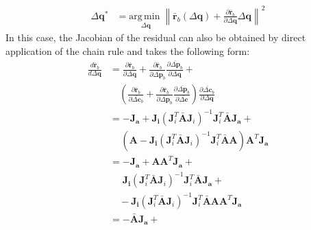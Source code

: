 \begin{equation}
    \begin{aligned}
        \Delta\mathbf{q}^* & = \underset{\Delta\mathbf{q}}{\mathrm{arg\,min\;}}  \left\| \bar{\mathbf{r}}_b(\Delta\mathbf{q}) + \frac{\partial \bar{\mathbf{r}}_b}{\partial\Delta\mathbf{q}} \Delta\mathbf{q} \right\|^2
    \label{eq:bidirectional_wiberg_problem2}
    \end{aligned}
\end{equation}
In this case, the Jacobian of the residual can also be obtained by direct application of the chain rule and takes the following form:
\begin{equation}
    \begin{aligned}
        \frac{d \bar{\mathbf{r}}_b}{d \Delta \mathbf{q}} & = \frac{\partial \bar{\mathbf{r}}_b}{\partial \Delta \mathbf{q}} + \frac{\partial \bar{\mathbf{r}}_b}{\partial \bar{\Delta \mathbf{p}}_b} \frac{\partial \bar{\Delta \mathbf{p}}_b}{\partial \Delta \mathbf{q}} +
        \\
        & \quad \left( \frac{\partial\bar{\mathbf{r}}_b}{\partial \bar{\Delta \mathbf{c}}_b} + \frac{\partial \bar{\mathbf{r}}_b}{\partial \bar{\Delta \mathbf{p}}_b} \frac{\partial \bar{\Delta \mathbf{p}}_b}{\partial \bar{\Delta \mathbf{c}}} \right) \frac{\partial \bar{\Delta \mathbf{c}}_b}{\partial \Delta \mathbf{q}}
        \\
        & = - \mathbf{J}_{\mathbf{a}} + \mathbf{J}_{\mathbf{i}} \left( \mathbf{J}_i^T \bar{\mathbf{A}} \mathbf{J}_i \right)^{-1} \mathbf{J}_i^T \bar{\mathbf{A}} \mathbf{J}_{\mathbf{a}} +
        \\
        & \quad \, \left(\mathbf{A} - \mathbf{J}_{\mathbf{i}} \left( \mathbf{J}_i^T \bar{\mathbf{A}} \mathbf{J}_i \right)^{-1} \mathbf{J}_i^T \bar{\mathbf{A}} \mathbf{A} \right) \mathbf{A}^T \mathbf{J}_{\mathbf{a}}
        \\
        & = - \mathbf{J}_{\mathbf{a}} + \mathbf{A}\mathbf{A}^T \mathbf{J}_{\mathbf{a}} +
        \\
        & \quad \, \, \mathbf{J}_{\mathbf{i}} \left( \mathbf{J}_i^T \bar{\mathbf{A}} \mathbf{J}_i \right)^{-1} \mathbf{J}_i^T \bar{\mathbf{A}} \mathbf{J}_{\mathbf{a}} +
        \\
        & \quad - \mathbf{J}_{\mathbf{i}} \left( \mathbf{J}_i^T \bar{\mathbf{A}} \mathbf{J}_i \right)^{-1} \mathbf{J}_i^T \bar{\mathbf{A}} \mathbf{A} \mathbf{A}^T \mathbf{J}_{\mathbf{a}}
        \\
        & = - \bar{\mathbf{A}} \mathbf{J}_{\mathbf{a}} +
        \\

\end{aligned}
\end{equation}
